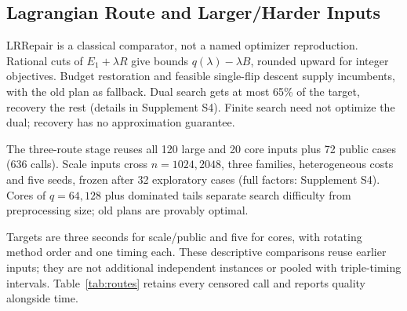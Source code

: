 \documentclass[conference]{IEEEtran}
\begin{document}
\subsection{Lagrangian Route and Larger/Harder Inputs}
LRRepair is a classical comparator, not a named optimizer reproduction. Rational cuts of $E_1+\lambda R$ give bounds $q(\lambda)-\lambda B$, rounded upward for integer objectives. Budget restoration and feasible single-flip descent supply incumbents, with the old plan as fallback. Dual search gets at most 65\% of the target, recovery the rest (details in Supplement S4). Finite search need not optimize the dual; recovery has no approximation guarantee.

The three-route stage reuses all 120 large and 20 core inputs plus 72 public cases (636 calls). Scale inputs cross $n=1024,2048$, three families, heterogeneous costs and five seeds, frozen after 32 exploratory cases (full factors: Supplement S4). Cores of $q=64,128$ plus dominated tails separate search difficulty from preprocessing size; old plans are provably optimal.

Targets are three seconds for scale/public and five for cores, with rotating method order and one timing each. These descriptive comparisons reuse earlier inputs; they are not additional independent instances or pooled with triple-timing intervals. Table~\ref{tab:routes} retains every censored call and reports quality alongside time.
\end{document}
